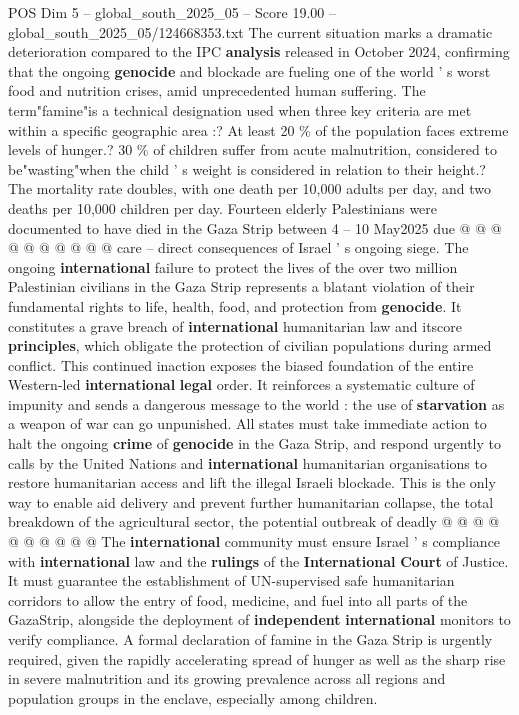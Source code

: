 \begin{textsample}{POS Dim 5 – global\_south\_2025\_05 – Score 19.00 – global\_south\_2025\_05/124668353.txt}
The current situation marks a dramatic deterioration compared to the IPC \textbf{analysis} released in October 2024, confirming that the ongoing \textbf{genocide} and blockade are fueling one of the world ' s worst food and nutrition crises, amid unprecedented human suffering.
The term"famine"is a technical designation used when three key criteria are met within a specific geographic area :?
At least 20 \% of the population faces extreme levels of hunger.? 30 \% of children suffer from acute malnutrition, considered to be"wasting"when the child ' s weight is considered in relation to their height.?
The mortality rate doubles, with one death per 10,000 adults per day, and two deaths per 10,000 children per day.
Fourteen elderly Palestinians were documented to have died in the Gaza Strip between 4 -- 10 May2025 due @ @ @ @ @ @ @ @ @ @ care -- direct consequences of Israel ' s ongoing siege.
The ongoing \textbf{international} failure to protect the lives of the over two million Palestinian civilians in the Gaza Strip represents a blatant violation of their fundamental rights to life, health, food, and protection from \textbf{genocide}.
It constitutes a grave breach of \textbf{international} humanitarian law and itscore \textbf{principles}, which obligate the protection of civilian populations during armed conflict.
This continued inaction exposes the biased foundation of the entire Western-led \textbf{international} \textbf{legal} order.
It reinforces a systematic culture of impunity and sends a dangerous message to the world : the use of \textbf{starvation} as a weapon of war can go unpunished.
All states must take immediate action to halt the ongoing \textbf{crime} of \textbf{genocide} in the Gaza Strip, and respond urgently to calls by the United Nations and \textbf{international} humanitarian organisations to restore humanitarian access and lift the illegal Israeli blockade.
This is the only way to enable aid delivery and prevent further humanitarian collapse, the total breakdown of the agricultural sector, the potential outbreak of deadly @ @ @ @ @ @ @ @ @ @ The \textbf{international} community must ensure Israel ' s compliance with \textbf{international} law and the \textbf{rulings} of the \textbf{International} \textbf{Court} of Justice.
It must guarantee the establishment of UN-supervised safe humanitarian corridors to allow the entry of food, medicine, and fuel into all parts of the GazaStrip, alongside the deployment of \textbf{independent} \textbf{international} monitors to verify compliance.
A formal declaration of famine in the Gaza Strip is urgently required, given the rapidly accelerating spread of hunger as well as the sharp rise in severe malnutrition and its growing prevalence across all regions and population groups in the enclave, especially among children.

\end{textsample}
